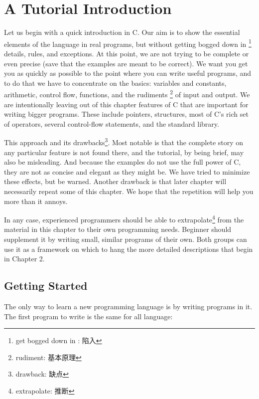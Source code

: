 \chapter{A Tutorial Introduction}

Let us begin with a quick introduction in C. Our aim is to show the essential elements of the language in real programs, but without getting bogged down in \footnote{get bogged down in : 陷入}
details, rules, and exceptions. At this point, we are not trying to be complete or even precise (save that the examples are meant to be correct). We want you get you as quickly as possible to the point where you can write useful programs, and to do that we have to concentrate on the basics: variables and constants, arithmetic, control flow, functions, and the rudiments \footnote{rudiment: 基本原理} of input and output. We are intentionally leaving out of this chapter features of C that are important for writing bigger programs. These include pointers, structures, most of C's rich set of operators, several control-flow statements, and the standard library.

This approach and its drawbacks\footnote{drawback: 缺点}. Most notable is that the complete story on any particular feature is  not found there, and the tutorial, by being brief, may also be misleading. And because the examples do not use the full power of C, they are not as concise and elegant as they might be. We have tried to minimize these effects, but be warned. Another drawback is that later chapter will necessarily repeat some of this chapter. We hope that the repetition will help you more than it annoys.

In any case, experienced programmers should be able to extrapolate\footnote{extrapolate: 推断} from the material in this chapter to their own programming needs. Beginner should supplement it by writing small, similar programs of their own. Both groups can use it as a framework on which to hang the more detailed descriptions that begin in Chapter 2.

\section{Getting Started}

The only way to learn a new programming language is by writing programs in it. The first program to write is the same for all language: